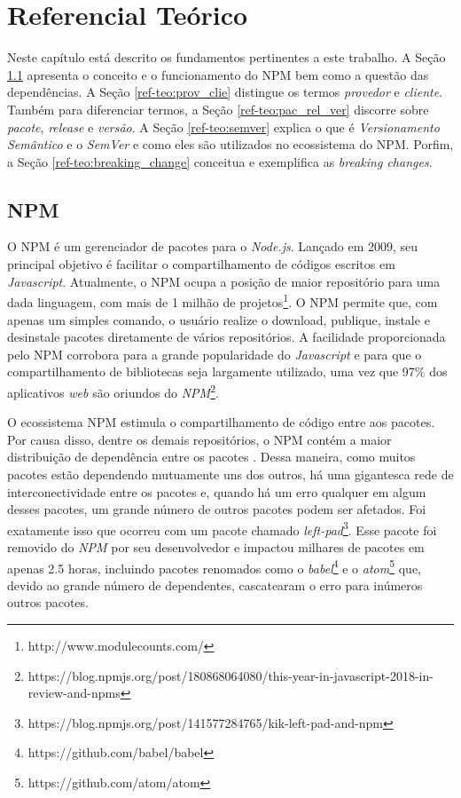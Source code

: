 \chapter{Referencial Teórico}
\label{cap:ref-teorico}
Neste capítulo está descrito os fundamentos pertinentes a este trabalho. A Seção \ref{ref-teo:npm} apresenta o conceito e o funcionamento do \gls{NPM} bem como a questão das dependências. A Seção \ref{ref-teo:prov_clie} distingue os termos \textit{provedor} e \textit{cliente}. Também para diferenciar termos, a Seção \ref{ref-teo:pac_rel_ver} discorre sobre \textit{pacote}, \textit{release} e \textit{versão}. A Seção \ref{ref-teo:semver} explica o que é \textit{Versionamento Semântico} e o \textit{SemVer} e como eles são utilizados no ecossistema do \gls{NPM}. Porfim, a Seção \ref{ref-teo:breaking_change} conceitua e exemplifica as \textit{breaking changes}.

\section{\gls{NPM}}
\label{ref-teo:npm}
O \gls{NPM} é um gerenciador de pacotes para o \textit{Node.js}. Lançado em 2009, seu principal objetivo é facilitar o compartilhamento de códigos escritos em \textit{Javascript}. Atualmente, o \gls{NPM} ocupa a posição de maior repositório para uma dada linguagem, com mais de 1 milhão de projetos\footnote{http://www.modulecounts.com/}. O \gls{NPM} permite que, com apenas um simples comando, o usuário realize o download, publique, instale e desinstale pacotes diretamente de vários repositórios. A facilidade proporcionada pelo \gls{NPM} corrobora para a grande popularidade do \textit{Javascript} e para que o compartilhamento de bibliotecas seja largamente utilizado, uma vez que 97\% dos aplicativos \textit{web} são oriundos do \textit{NPM}\footnote{https://blog.npmjs.org/post/180868064080/this-year-in-javascript-2018-in-review-and-npms}.

O ecossistema \gls{NPM} estimula o compartilhamento de código entre aos pacotes. Por causa disso, dentre os demais repositórios, o \gls{NPM} contém a maior distribuição de dependência entre os pacotes \cite{teorical_reference:npm_2}. Dessa maneira, como muitos pacotes estão dependendo mutuamente uns dos outros, há uma gigantesca rede de interconectividade entre os pacotes e, quando há um erro qualquer em algum desses pacotes, um grande número de outros pacotes podem ser afetados. Foi exatamente isso que ocorreu com um pacote chamado \textit{left-pad}\footnote{https://blog.npmjs.org/post/141577284765/kik-left-pad-and-npm}. Esse pacote foi removido do \textit{NPM} por seu desenvolvedor e impactou milhares de pacotes em apenas 2.5 horas, incluindo pacotes renomados como o \textit{babel}\footnote{https://github.com/babel/babel} e o \textit{atom}\footnote{https://github.com/atom/atom} que, devido ao grande número de dependentes, cascatearam o erro para inúmeros outros pacotes.


